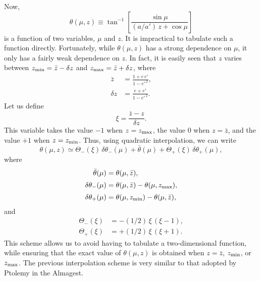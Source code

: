 Now, 
\begin{equation}
\theta(\mu,z) \equiv \tan^{-1}\left[ \frac{\sin\mu}{(a/a')\,z+ \cos\mu}\right]
\end{equation}
is a function of two variables, $\mu$ and $z$. It is impractical to tabulate
such a function directly. Fortunately, while $\theta(\mu,z)$
has a strong dependence on $\mu$, it only has a fairly weak dependence on $z$.
In fact, it is easily seen that $z$ varies between $z_{\rm min} = \bar{z} - \delta z$
and $z_{\rm max} = \bar{z}+\delta z$, where
\begin{align}
\bar{z}& = \frac{1+e\,e'}{1-e'^{\,2}},\\[0.5ex]
\delta z& = \frac{e+e'}{1-e'^{\,2}}.
\end{align}
Let us define
\begin{equation}
\xi = \frac{\bar{z}-z}{\delta z}.
\end{equation}
This variable takes the value $-1$ when $z=z_{\rm max}$, the value $0$ when
$z=\bar{z}$, and the value $+1$ when $z=z_{\rm min}$. 
Thus, using quadratic interpolation, we can write
\begin{equation}
\theta(\mu,z)\simeq \Theta_-(\xi)\,\delta\theta_-(\mu) + \bar{\theta}(\mu)
+ \Theta_+(\xi)\,\delta\theta_+(\mu),
\end{equation}
where
\begin{align}
\bar{\theta}(\mu)  &= \theta(\mu,\bar{z}),\\[0.5ex]
\delta\theta_-(\mu) &= \theta(\mu,\bar{z}) - \theta(\mu,z_{\rm max}),\\[0.5ex]
\delta\theta_+(\mu) &= \theta(\mu,z_{\rm min}) - \theta(\mu,\bar{z}),
\end{align}
and
\begin{align}\label{ve52}
\Theta_-(\xi) &= - (1/2)\,\xi\,(\xi-1),\\[0.5ex]
\Theta_+(\xi) &=+ (1/2)\,\xi\,(\xi+1).\label{ve53}
\end{align}
This scheme allows us to avoid having to tabulate a
two-dimensional function, while ensuring that the exact value of $\theta(\mu,z)$ is obtained
when $z=\bar{z}$, $z_{\rm min}$, or $z_{\rm max}$. The previous interpolation
scheme is very similar to that adopted by Ptolemy in the Almagest.

